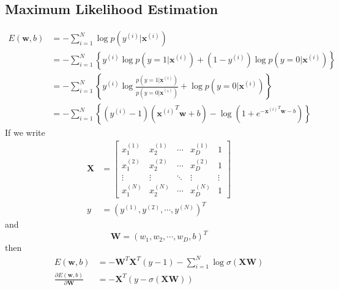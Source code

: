 \documentclass{article}
\newcommand \w{\mathbf{w}}
\newcommand \xxi{\mathbf{x}^{(i)}}
\newcommand \yi{y^{(i)}}
\newcommand \sumi {\sum_{i=1}^}
\begin{document}
\subsection{Maximum Likelihood Estimation}
\begin{align*}
E(\w, b) &= - \sumi{N} \log p\left( \yi | \xxi \right) \\
&= - \sumi{N} \left\{ \yi \log p\left( y=1 | \xxi \right) + \left( 1 - \yi \right) \log p\left( y=0 | \xxi \right) \right\} \\
&= - \sumi{N} \left\{ \yi \log \frac{p\left(y=1|\xxi \right)}{p\left(y=0|\xxi \right)} + \log p\left( y=0 | \xxi \right) \right\} \\
&= - \sumi{N} \left\{ \left( \yi-1 \right) \left( {\xxi}^T\w + b \right) - \log \left( 1 + e^{-{\xxi}^T\w - b} \right) \right\}
\end{align*}
If we write
\begin{align*}
\mathbf{X} &= \left[ \begin{array}{ccccc}
x_1^{(1)} & x_2^{(1)} & \cdots & x_D^{(1)} & 1  \\
x_1^{(2)} & x_2^{(2)} & \cdots & x_D^{(2)} & 1  \\
\vdots & \vdots & \ddots & \vdots & \vdots  \\
x_1^{(N)} & x_2^{(N)} & \cdots & x_D^{(N)} & 1
\end{array} \right]  \\
y &= \left( y^{(1)}, y^{(2)}, \cdots, y^{(N)} \right)^T
\end{align*}
and
\[
\mathbf{W} = (w_1, w_2, \cdots, w_D, b)^T
\]
then
\begin{align}
E(\w, b) &= -\mathbf{W}^T \mathbf{X}^T (y-1) - \sumi{N} \log \sigma \left( \mathbf{X} \mathbf{W} \right)  \\
\frac{\partial E(\w, b)}{\partial \mathbf{W}} &=  -\mathbf{X}^T \left( y - \sigma \left( \mathbf{X} \mathbf{W} \right) \right)
\end{align}
\end{document}
